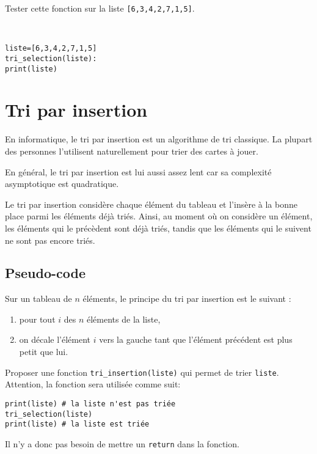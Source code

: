 \begin{exercice}
Tester cette fonction sur la liste \verb?[6,3,4,2,7,1,5]?.
\end{exercice}

\begin{solution}~\\
\vspace{-0.7cm}
\begin{verbatim}
liste=[6,3,4,2,7,1,5]
tri_selection(liste): 
print(liste)
\end{verbatim}    
\end{solution}

\section{Tri par insertion}

En informatique, le tri par insertion est un algorithme de tri classique. La plupart des personnes l'utilisent naturellement pour trier des cartes à jouer.

En général, le tri par insertion est lui aussi assez lent car sa complexité asymptotique est quadratique. 

Le tri par insertion considère chaque élément du tableau et l'insère à la bonne place parmi les éléments déjà triés. Ainsi, au moment où on considère un élément, les éléments qui le précèdent sont déjà triés, tandis que les éléments qui le suivent ne sont pas encore triés. 

\subsection{Pseudo-code}

Sur un tableau de $n$ éléments, le principe du tri par insertion est le suivant :
\begin{enumerate}
 \item pour tout $i$ des $n$ éléments de la liste,
 \item on décale l'élément $i$ vers la gauche tant que l'élément précédent est plus petit que lui.
\end{enumerate}

\begin{exercice}
Proposer une fonction \verb?tri_insertion(liste)? qui permet de trier \verb?liste?. Attention, la fonction sera utilisée comme suit:
\begin{verbatim}
print(liste) # la liste n'est pas triée
tri_selection(liste)
print(liste) # la liste est triée
\end{verbatim}

Il n'y a donc pas besoin de mettre un \verb?return? dans la fonction.
\end{exercice}

